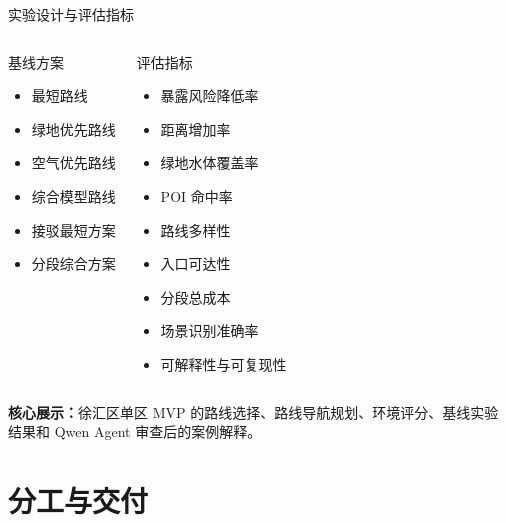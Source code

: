 \documentclass[xcolor=table,dvipsnames,svgnames,aspectratio=169]{ctexbeamer}
\newcommand{\smallitem}{\setlength{\itemsep}{0.25em}}
\begin{document}
\begin{frame}{实验设计与评估指标}
  \scriptsize
  \begin{columns}[T]
    \begin{block}{基线方案}
      \begin{itemize}
        \smallitem
        \item 最短路线
        \item 绿地优先路线
        \item 空气优先路线
        \item 综合模型路线
        \item 接驳最短方案
        \item 分段综合方案
      \end{itemize}
    \end{block}

    \begin{block}{评估指标}
      \begin{itemize}
        \smallitem
        \item 暴露风险降低率
        \item 距离增加率
        \item 绿地水体覆盖率
        \item POI 命中率
        \item 路线多样性
        \item 入口可达性
        \item 分段总成本
        \item 场景识别准确率
        \item 可解释性与可复现性
      \end{itemize}
    \end{block}
  \end{columns}

  \vspace{0.2em}
  {\color{cprimary}\textbf{核心展示：}}徐汇区单区 MVP 的路线选择、路线导航规划、环境评分、基线实验结果和 Qwen Agent 审查后的案例解释。
\end{frame}

\section{分工与交付}
\end{document}
